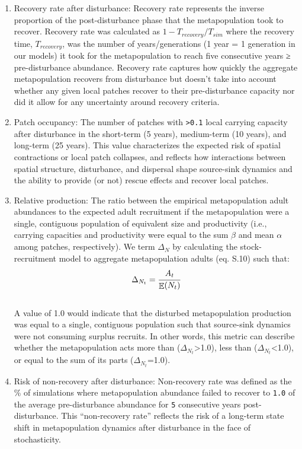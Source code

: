 \documentclass[
]{article}
\begin{document}
\begin{enumerate}
\def\labelenumi{\arabic{enumi}.}
\item
  Recovery rate after disturbance: Recovery rate represents the inverse
  proportion of the post-disturbance phase that the metapopulation took
  to recover. Recovery rate was calculated as \(1-T_{recovery}/T_{sim}\)
  where the recovery time, \(T_{recovery}\), was the number of
  years/generations (1 year = 1 generation in our models) it took for
  the metapopulation to reach five consecutive years ≥ pre-disturbance
  abundance. Recovery rate captures how quickly the aggregate
  metapopulation recovers from disturbance but doesn't take into account
  whether any given local patches recover to their pre-disturbance
  capacity nor did it allow for any uncertainty around recovery
  criteria.
\item
  Patch occupancy: The number of patches with \texttt{\textgreater{}0.1}
  local carrying capacity after disturbance in the short-term (5 years),
  medium-term (10 years), and long-term (25 years). This value
  characterizes the expected risk of spatial contractions or local patch
  collapses, and reflects how interactions between spatial structure,
  disturbance, and dispersal shape source-sink dynamics and the ability
  to provide (or not) rescue effects and recover local patches.
\item
  Relative production: The ratio between the empirical metapopulation
  adult abundances to the expected adult recruitment if the
  metapopulation were a single, contiguous population of equivalent size
  and productivity (i.e., carrying capacities and productivity were
  equal to the sum \(\beta\) and mean \(\alpha\) among patches,
  respectively). We term \(\Delta_{N}\) by calculating the
  stock-recruitment model to aggregate metapopulation adults (eq. S.10)
  such that:\\
  \begin{align}
  \Delta_{N_t}=\cfrac{A_t}{\mathop{\mathrm{\mathbb{E}}}(N_t)}
  \end{align}\\
  A value of 1.0 would indicate that the disturbed metapopulation
  production was equal to a single, contiguous population such that
  source-sink dynamics were not consuming surplus recruits. In other
  words, this metric can describe whether the metapopulation acts more
  than (\(\Delta_{N_t}\)\textgreater1.0), less than
  (\(\Delta_{N_t}\)\textless1.0), or equal to the sum of its parts
  (\(\Delta_{N_t}\)=1.0).
\item
  Risk of non-recovery after disturbance: Non-recovery rate was defined
  as the \% of simulations where metapopulation abundance failed to
  recover to \texttt{1.0} of the average pre-disturbance abundance for
  \texttt{5} consecutive years post-disturbance. This ``non-recovery
  rate'' reflects the risk of a long-term state shift in metapopulation
  dynamics after disturbance in the face of stochasticity.
\end{enumerate}
\end{document}
